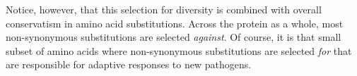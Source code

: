 \documentclass[12pt]{article}
\begin{document}
Notice, however, that this selection for diversity is combined with
overall conservatism in amino acid substitutions. Across the protein
as a whole, most non-synonymous substitutions are selected {\it
against}. Of course, it is that small subset of amino acids where
non-synonymous substitutions are selected {\it for} that are
responsible for adaptive responses to new pathogens.

 


\ccLicense
\end{document}
